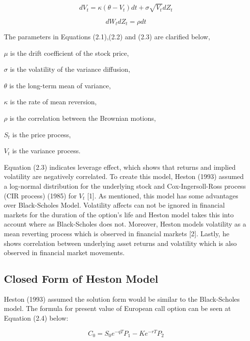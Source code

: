 \documentclass[fontsize=12pt]{article}
\numberwithin{equation}{section} %
\numberwithin{figure}{section} %
\numberwithin{table}{section} %
\begin{document}
\begin{equation}
dV_t=\kappa (\theta-V_t) dt+\sigma \sqrt{V_t} dZ_t	
\end{equation}

\begin{equation}
dW_t dZ_t=\rho dt	
\end{equation}

The parameters in Equations (2.1),(2.2) and (2.3) are clarified below,

$\mu$ is the drift coefficient of the stock price, 

$\sigma$ is the volatility of the variance diffusion,

$\theta$ is the long-term mean of variance,

$\kappa$ is the rate of mean reversion,

$\rho$  is the correlation between the Brownian motions,

$S_t$ is the price process,

$V_t$ is the variance process.

\bigskip

Equation (2.3) indicates leverage effect, which shows that returns and implied volatility are negatively correlated.
	To create this model, Heston (1993) assumed a log-normal distribution for the underlying stock and Cox-Ingersoll-Ross process (CIR process) (1985) for $V_t$ [1]. As mentioned, this model has some advantages over Black-Scholes Model. Volatility affects can not be ignored in financial markets for the duration of the option's life and Heston model takes this into account where as Black-Scholes does not. Moreover, Heston models volatility as a mean reverting process which is observed in financial markets [2]. Lastly, he shows correlation between underlying asset returns and volatility which is also observed in financial market movements. 
	
\subsection{Closed Form of Heston Model} \label{Closed Form of Heston Model}

	Heston (1993) assumed the solution form would be similar to the Black-Scholes model.  The formula for present value of European call option can be seen at Equation (2.4) below:

\begin{equation}
C_0 = S_0 e^{-qT} P_1 - K e^{-rT} P_2  
\end{equation}
\end{document}
